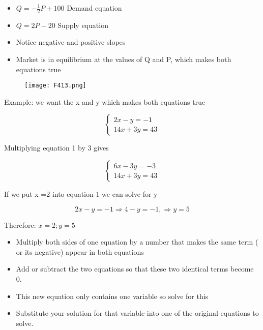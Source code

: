 \begin{frame}
\begin{itemize}
   \item $Q = -\frac{1}{2}P + 100$  Demand equation
   \item $Q = 2P - 20$ Supply equation
   \item Notice negative and positive slopes
   \item Market is in equilibrium at the values of Q and P, which makes both equations true
\end{itemize}
 \begin{figure}
    \centering
    \texttt{[image: F413.png]} %
  \end{figure}
\end{frame}
\begin{frame}
Example: we want the x and y which makes both equations true

$$ \begin{cases}
  2x - y = -1\\
  14x + 3y = 43
\end{cases} $$

Multiplying equation 1 by 3 gives

$$ \begin{cases}
  6x - 3y = -3\\
  14x + 3y = 43
\end{cases} $$

If we put x =2 into equation 1 we can solve for y

$$2x-y= -1  \Rightarrow   4-y = -1, \Rightarrow y = 5$$

Therefore: $ x = 2 ;  y = 5$

\end{frame}
\begin{frame}
\begin{itemize}
   \item Multiply both sides of one equation by a number that makes the same term ( or its negative) appear in both equations
  \item Add or subtract the two equations so that these two identical terms become 0.
  \item This new equation only contains one variable so solve for this
  \item Substitute your solution for that variable into one of the original equations to solve.
\end{itemize}
\end{frame}
